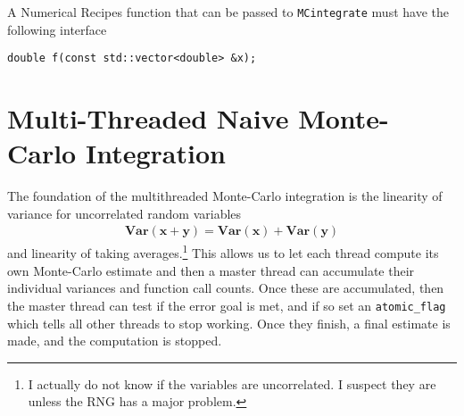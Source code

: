 \documentclass[landscape]{article}
\numberwithin{equation}{section}
\begin{document}
A Numerical Recipes function that can be passed to \texttt{MCintegrate} must have the following interface
\begin{verbatim}
double f(const std::vector<double> &x);
\end{verbatim}


\section{Multi-Threaded Naive Monte-Carlo Integration}

The foundation of the multithreaded Monte-Carlo integration is the linearity of variance for uncorrelated random variables
\begin{align*}
\mathbf{Var}(\mathbf{x} + \mathbf{y}) = \mathbf{Var}(\mathbf{x}) + \mathbf{Var}(\mathbf{y})
\end{align*}
and linearity of taking averages.\footnote{I actually do not know if the variables are uncorrelated. I suspect they are unless the RNG has a major problem.}
This allows us to let each thread compute its own Monte-Carlo estimate and then a master thread can accumulate their individual variances and function call counts.
Once these are accumulated, then the master thread can test if the error goal is met, and if so set an \texttt{atomic\_flag} which tells all other threads to stop working.
Once they finish, a final estimate is made, and the computation is stopped.
\end{document}
